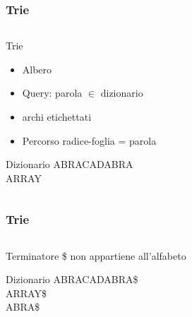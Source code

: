 \begin{frame}[fragile]
\frametitle{Trie}
\begin{columns}
\begin{column}{0.6\textwidth}
\begin{block}{Trie}
\begin{itemize}
\item
Albero
\item
Query: parola $\in$ dizionario
\item
archi etichettati
\item
Percorso radice-foglia = parola
\end{itemize}
\end{block}
\begin{block}{Dizionario}
ABRACADABRA\\
ARRAY\\
\end{block}
\end{column}
\begin{column}{0.4\textwidth}
\begin{center}
\end{center}
\end{column}
\end{columns}
\end{frame}

\begin{frame}[fragile]
\frametitle{Trie}
\begin{columns}
\begin{column}{0.6\textwidth}
\begin{block}{Terminatore}
\$ non appartiene all'alfabeto
\end{block}
\begin{block}{Dizionario}
ABRACADABRA\$\\
ARRAY\$\\
ABRA\$
\end{block}
\end{column}
\begin{column}{0.4\textwidth}
\begin{center}
\end{center}
\end{column}
\end{columns}
\end{frame}

